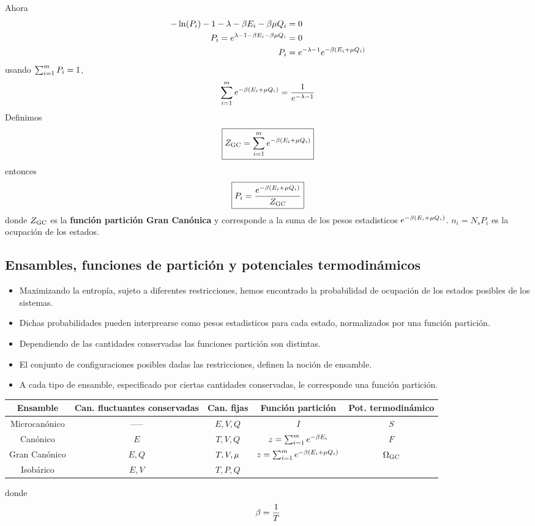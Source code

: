 Ahora
\begin{align}
  -\ln(P_i)-1-\lambda-\beta E_i-\beta\mu Q_i&=0\\
  P_i=e^{\lambda-1-\beta E_i-\beta\mu Q_i}&=0\\
  P_i&=e^{-\lambda-1}e^{-\beta(E_i+\mu Q_i)}
\end{align}
usando $\sum_{i=1}^m P_i=1$,
\begin{align}
  \sum_{i=1}^m e^{-\beta (E_i+\mu Q_i)}=\frac{1}{e^{-\lambda-1}}
\end{align}
Definimos
\begin{equation}
\boxed{  Z_{\rm GC}=\sum_{i=1}^m e^{-\beta (E_i+\mu Q_i)}}
\end{equation}
entonces
\begin{equation}
 \boxed{ P_i=\frac{e^{-\beta (E_i+\mu Q_i)}}{Z_{\rm GC}}}
\end{equation}
donde $Z_{\rm GC}$ es la \textbf{función partición Gran Canónica} y corresponde a la suma de los pesos estadisticos $e^{-\beta (E_i+\mu Q_i)}$. $n_i=N_sP_i$ es la ocupación de los estados.

\subsection{Ensambles, funciones de partición y potenciales termodinámicos}
\begin{itemize}
	\item Maximizando la entropía, sujeto a diferentes restricciones, hemos encontrado la probabilidad de ocupación de los estados posibles de los sistemas.
	\item Dichas probabilidades pueden interprearse como pesos estadisticos para cada estado, normalizados por una función partición.
	\item Dependiendo de las cantidades conservadas las funciones partición son distintas.
	\item El conjunto de configuraciones posibles dadas las restricciones, definen la noción de ensamble.
	\item A cada tipo de ensamble, especificado por ciertas cantidades conservadas, le corresponde una función partición.
\end{itemize}


\begin{center}
\begin{tabular}{|c|c|c|c|c|}
\hline
  Ensamble & Can. fluctuantes conservadas & Can. fijas & Función partición & Pot. termodinámico  \\
  \hline\hline
  Microcanónico & ----- & $E,V,Q$& $I$& $S$ \\\hline
  Canónico&$E$ &$T,V,Q$&$z=\sum_{i=1}^m e^{-\beta E_i}$&$F$\\\hline
  Gran Canónico&$E,Q$&$T,V,\mu$&$z=\sum_{i=1}^m e^{-\beta(E_i+\mu Q_i)}$&$\Omega_{\rm GC}$\\\hline
  Isobárico&$E,V$&$T,P,Q$&&\\\hline
\end{tabular}
\end{center}
donde
\begin{equation}
  \beta=\frac{1}{T}
\end{equation}

